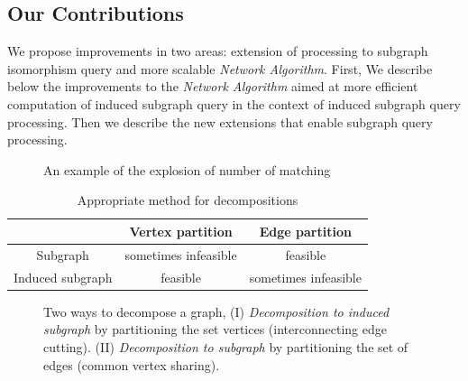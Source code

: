 \subsection{Our Contributions}

We propose improvements in two areas: extension of processing to subgraph isomorphism query and more scalable \textit{Network Algorithm}. First, We describe below the improvements to the \textit{Network Algorithm} aimed at more efficient computation of induced subgraph query in the context of induced subgraph query processing. Then we describe the new extensions that enable subgraph query processing. 


\begin{figure}
        \centering
        
        \caption{An example of the explosion of number of matching \label{fig:fig3} }
\end{figure}

\begin{table}
\begin{center}\begin{tabular}{|c|c|c|}
\hline
  & Vertex partition  & Edge partition  \\ \hline
Subgraph & sometimes infeasible  & feasible \\ \hline
Induced subgraph & feasible & sometimes  infeasible \\ \hline
\end{tabular}
\caption{Appropriate method for decompositions \label{tab:table1} }
\end{center}
\end{table}

\begin{figure}
\centering

\caption{Two ways to decompose a graph, (I) \textit{Decomposition to induced subgraph} by partitioning the set vertices (interconnecting edge cutting). (II) \textit{Decomposition to subgraph} by partitioning the set of edges (common vertex sharing).}
\label{fig:fig4}
\end{figure}

